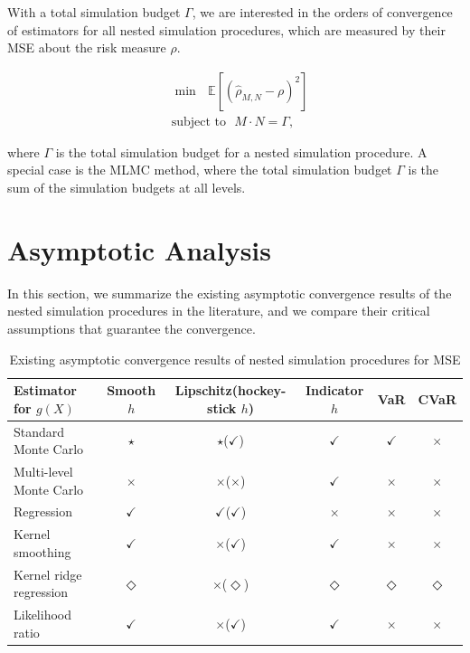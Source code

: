 With a total simulation budget $\Gamma$, we are interested in the orders of convergence of estimators for all nested simulation procedures, which are measured by their MSE about the risk measure $\rho$.

\begin{align}
    & \min ~~~ \mathbb{E} \left[ \left( \hat{\rho}_{M, N} - \rho \right)^2 \right] \nonumber \\
    & \text{subject to} ~~~ M \cdot N = \Gamma, 
\end{align}

where $\Gamma$ is the total simulation budget for a nested simulation procedure.
A special case is the MLMC method, where the total simulation budget $\Gamma$ is the sum of the simulation budgets at all levels.

\section{Asymptotic Analysis} \label{sec1:asymptotic-convergence}
In this section, we summarize the existing asymptotic convergence results of the nested simulation procedures in the literature, and we compare their critical assumptions that guarantee the convergence.

\begin{table}[ht]
    \centering
    \footnotesize
    \begin{tabular}{|l|c|c|c|c|c|}
    \hline
    \textbf{Estimator for} $g(X)$ & \textbf{Smooth} $h$ & \textbf{Lipschitz}(\textbf{hockey-stick} $h$) & \textbf{Indicator} $h$ & \textbf{VaR} & \textbf{CVaR} \\
    \hline
    Standard Monte Carlo & $\star$ & $\star$($\checkmark$) & $\checkmark$ & $\checkmark$ & $\times$ \\
    \hline
    Multi-level Monte Carlo & $\times$ & $\times$($\times$) & $\checkmark$ & $\times$ & $\times$ \\
    \hline
    Regression & $\checkmark$ & $\checkmark$($\checkmark$) & $\times$ & $\times$ & $\times$ \\
    \hline
    Kernel smoothing & $\checkmark$ & $\times$($\checkmark$) & $\checkmark$ & $\times$ & $\times$ \\
    \hline
    Kernel ridge regression & $\Diamond$ & $\times$($\Diamond$) & $\Diamond$ & $\Diamond$ & $\Diamond$ \\
    \hline
    Likelihood ratio & $\checkmark$ & $\times$($\checkmark$) & $\checkmark$ & $\times$ & $\times$ \\
    \hline
    \end{tabular}
    \caption{Existing asymptotic convergence results of nested simulation procedures for MSE}
    \label{tab1:asymConv-mse}
\end{table}


